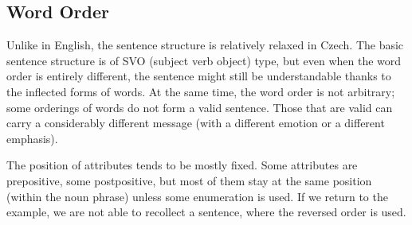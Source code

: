 \subsection{Word Order}
Unlike in English, the sentence structure is relatively relaxed in Czech. The basic sentence structure is of SVO (subject verb object) type, but even when the word order is entirely different, the sentence might still be understandable thanks to the inflected forms of words. At the same time, the word order is not arbitrary; some orderings of words do not form a valid sentence. Those that are valid can carry a considerably different message (with a different emotion or a different emphasis).

The position of attributes tends to be mostly fixed. Some attributes are prepositive, some postpositive, but most of them stay at the same position (within the noun phrase) unless some enumeration is used. If we return to the  example, we are not able to recollect a sentence, where the reversed order is used.

